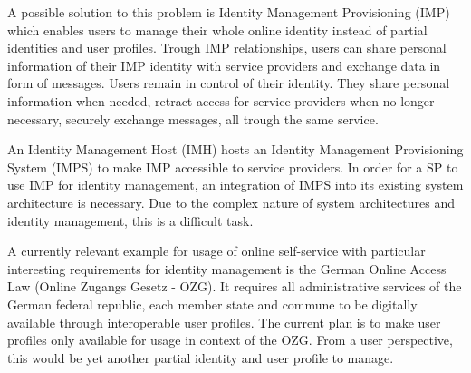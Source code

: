 A possible solution to this problem is Identity Management Provisioning (IMP) which enables users to manage their whole online identity instead of partial identities and user profiles. Trough IMP relationships, users can share personal information of their IMP identity with service providers and exchange data in form of messages. Users remain in control of their identity. They share personal information when needed, retract access for service providers when no longer necessary, securely exchange messages, all trough the same service.

An Identity Management Host (IMH) hosts an Identity Management Provisioning System (IMPS) to make IMP accessible to service providers. In order for a SP to use IMP for identity management, an integration of IMPS into its existing system architecture is necessary. Due to the complex nature of system architectures and identity management, this is a difficult task.

A currently relevant example for usage of online self-service with particular interesting requirements for identity management is the German Online Access Law (Online Zugangs Gesetz - OZG). It requires all administrative services of the German federal republic, each member state and commune to be digitally available through interoperable user profiles. The current plan is to make user profiles only available for usage in context of the OZG. From a user perspective, this would be yet another partial identity and user profile to manage.